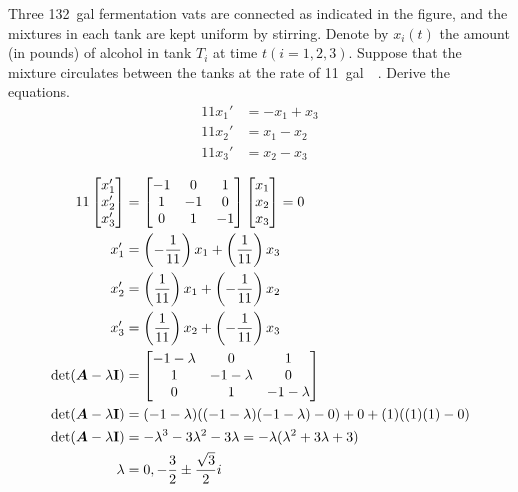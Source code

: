 \documentclass{article}
\begin{document}
Three \SI{132}{gal} fermentation vats are connected as indicated in the figure, and the mixtures in each tank are kept uniform by stirring. Denote by $ x_i(t) $ the amount (in pounds) of alcohol in tank $ T_i $ at time $ t (i = 1, 2, 3) $. Suppose that the mixture circulates between the tanks at the rate of \SI{11}{gal \per \min}. Derive the equations.
\begin{align*}
	11x_1' & = -x_1 + x_3 \\
	11x_2' & = x_1 - x_2 \\
	11x_3' & = x_2 - x_3
\end{align*}

\hr

\begin{align*}
	11 \begin{bmatrix} x_1' \\ x_2' \\ x_3' \end{bmatrix} & =
	\begin{bmatrix}
		-1 & 0 & 1 \\
		1 & -1 & 0 \\
		0 & 1 & -1
	\end{bmatrix}
	\begin{bmatrix} x_1 \\ x_2 \\ x_3 \end{bmatrix} = 0 \\
	x_1' & = \left( -\frac{1}{11} \right) x_1 + \left( \frac{1}{11} \right) x_3 \\
	x_2' & = \left( \frac{1}{11} \right) x_1 + \left( -\frac{1}{11} \right) x_2 \\
	x_3' & = \left( \frac{1}{11} \right) x_2 + \left( -\frac{1}{11} \right) x_3 \\
	\det( \matr{A} - \lambda \vect{I} ) & =
		\begin{bmatrix}
			-1 - \lambda & 0 & 1  \\
			1 & -1 - \lambda & 0 \\
			0 & 1 & -1 - \lambda
		\end{bmatrix} \\
	\det( \matr{A} - \lambda \vect{I} ) & =
		(-1 - \lambda)( (-1 - \lambda)(-1 - \lambda) - 0 ) + 0 + (1)( (1)(1) - 0 ) \\
	\det( \matr{A} - \lambda \vect{I} ) & =
		-\lambda^3 - 3\lambda^2 - 3\lambda = -\lambda(\lambda^2 + 3\lambda + 3) \\
	\lambda & = 0, -\frac{3}{2}\pm \frac{\sqrt{3}}{2}i
\end{align*}
\end{document}
